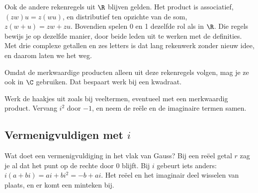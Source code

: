Ook de andere rekenregels uit $\R$ blijven gelden. Het product is associatief, $(zw)u = z(wu)$, en distributief ten opzichte van de som, $z(w + u) = zw + zu$. Bovendien spelen 0 en 1 dezelfde rol als in $\R$. Die regels bewijs je op dezelfde manier, door beide leden uit te werken met de definities. Met drie complexe getallen en zes letters is dat lang rekenwerk zonder nieuw idee, en daarom laten we het weg.

Omdat de merkwaardige producten alleen uit deze rekenregels volgen, mag je ze ook in $\C$ gebruiken. Dat bespaart werk bij een kwadraat.


\begin{werkwijze}
Werk de haakjes uit zoals bij veeltermen, eventueel met een merkwaardig product. Vervang $i^2$ door $-1$, en neem de reële en de imaginaire termen samen.
\end{werkwijze}


\begin{oefeningen}
\end{oefeningen}

\subsection{Vermenigvuldigen met \texorpdfstring{$i$}{i}}

Wat doet een vermenigvuldiging in het vlak van Gauss? Bij een reëel getal $r$ zag je al dat het punt op de rechte door 0 blijft. Bij $i$ gebeurt iets anders: $i(a + bi) = ai + bi^2 = -b + ai$. Het reëel en het imaginair deel wisselen van plaats, en er komt een minteken bij.

